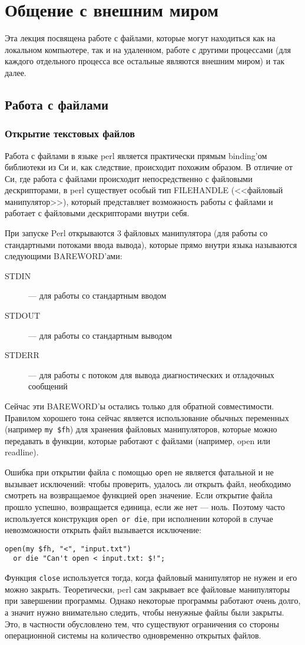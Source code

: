 \setcounter{chapter}{4}
\chapter{Общение с внешним миром}
Эта лекция посвящена работе с файлами, которые могут находиться как на локальном компьютере, так и на удаленном, работе с другими процессами (для каждого отдельного процесса все остальные являются внешним миром) и так далее.

\section{Работа с файлами}
\subsection{Открытие текстовых файлов}
Работа с файлами в языке perl является практически прямым binding'ом библиотеки из Си и, как следствие, происходит похожим образом. В отличие от Си, где работа с файлами происходит непосредственно с файловыми дескрипторами, в perl существует особый тип FILEHANDLE (<<файловый манипулятор>>), который представляет возможность работы с файлами и работает с файловыми дескрипторами внутри себя.

При запуске Perl открываются 3 файловых манипулятора (для работы со стандартными потоками ввода вывода), которые прямо внутри языка называются следующими BAREWORD'ами:
\begin{description}
  \item[STDIN] --- для работы со стандартным вводом
  \item[STDOUT] --- для работы со стандартным выводом
  \item[STDERR] --- для работы с потоком для вывода диагностических и отладочных сообщений
\end{description}
Сейчас эти BAREWORD'ы остались только для обратной совместимости. Правилом хорошего тона сейчас является использование обычных переменных (например \verb|my $fh|) для хранения файловых манипуляторов, которые можно передавать в функции, которые работают с файлами (например, open или readline).

Ошибка при открытии файла с помощью \verb|open| не является фатальной и не вызывает исключений: чтобы проверить, удалось ли открыть файл, необходимо смотреть на возвращаемое функцией \verb|open| значение. Если открытие файла прошло успешно, возвращается единица, если же нет --- ноль. Поэтому часто используется конструкция \verb|open or die|, при исполнении которой в случае невозможности открыть файл вызывается исключение:
\begin{verbatim}
open(my $fh, "<", "input.txt")
  or die "Can't open < input.txt: $!";
\end{verbatim}
Функция \verb|close| используется тогда, когда файловый манипулятор не нужен и его можно закрыть. Теоретически, perl сам закрывает все файловые манипуляторы при завершении программы. Однако некоторые программы работают очень долго, а значит нужно внимательно следить, чтобы ненужные файлы были закрыты. Это, в частности обусловлено тем, что существуют ограничения со стороны операционной системы на количество одновременно открытых файлов.

